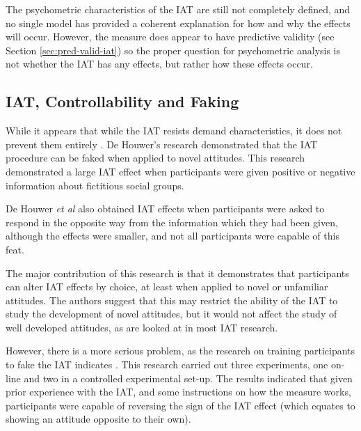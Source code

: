 The psychometric characteristics of the IAT are still not completely defined, and no single model has provided a coherent explanation for how and why the effects will occur. However, the measure does appear to have predictive validity (see Section \ref{sec:pred-valid-iat}) so the proper question for psychometric analysis is not whether the IAT has any effects, but rather how these effects occur. 




\subsection{IAT, Controllability and Faking}
\label{sec:iat-contr-faking}

While it appears that while the IAT resists demand characteristics, it does not prevent them entirely \cite{DeHouwer2007b}. De Houwer's research demonstrated that the IAT procedure can be faked when applied to novel attitudes. This research  demonstrated a large IAT effect when participants were given positive or negative information about fictitious social groups. 

De Houwer \textit{et al} also obtained IAT effects when participants were asked to respond in the opposite way from the information which they had been given, although the effects were smaller, and not all participants were capable of this feat.  

The major contribution of this research is that it demonstrates that participants can alter IAT effects by choice, at least when applied to novel or unfamiliar attitudes. The authors suggest that this may restrict the ability of the IAT to study the development of novel attitudes, but it would not affect the study of well developed attitudes, as are looked at in most IAT research.

However, there is a more serious problem, as the research on training participants to fake the IAT indicates \cite{Fiedler2005}. This research carried out three experiments, one on-line and two in a controlled experimental set-up. The results indicated that given prior experience with the IAT, and some instructions on how the measure works, participants were capable of reversing the sign of the IAT effect (which equates to showing an attitude opposite to their own). 

